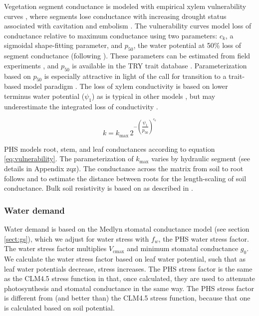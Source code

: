 \documentclass[draft,linenumbers]{agujournal}
\begin{document}
     
     Vegetation segment conductance is modeled with empirical xylem vulnerability curves \citep{tyree1989}, 
     where segments lose conductance with increasing drought status associated with 
     cavitation and embolism \citep{holbrook2001}.
     The vulnerability curves model loss of conductance relative to maximum conductance using two parameters: 
     $c_k$, a sigmoidal shape-fitting parameter, and 
     $p_{50}$, the water potential at 50\% loss of segment conductance (following \cite{gentine2016}). 
     These parameters can be estimated from field experiments \citep{sack2002}, 
     and $p_{50}$ is available in the TRY trait database \citep{kattge2011}.
     Parameterization based on $p_{50}$ is especially attractive in light of the call for transition to
     a trait-based model paradigm \citep{anderegg2015}.
     The loss of xylem conductivity is based on lower terminus water potential ($\psi_1$)
     as is typical in other models \citep{xu2016}, but 
     may underestimate the integrated loss of conductivity \citep{sperry2015}. 
         
     \begin{linenomath*}
     \begin{equation}
     \label{eq:vulnerability}
     k = k_{\text{max}} \, 2^{-\left(\dfrac{\psi_1}{p_{50}}\right)^{c_k}}
     \end{equation}
     \end{linenomath*}
     
     PHS models root, stem, and leaf conductances according to equation \ref{eq:vulnerability}.
     The parameterization of $k_{\text{max}}$ varies by hydraulic segment (see details in Appendix zqz).
     The conductance across the matrix from soil to root follows \citet{williams2001} and \citet{bonan2014} 
     to estimate the distance between roots for the length-scaling of soil conductance. 
     Bulk soil resistivity is based on \citet{clapp1978} as described in \citet{oleson2013}.
    
    \subsubsection{Water demand}
    
    Water demand is based on the Medlyn stomatal conductance model (see section \ref{sect:gs}), 
    which we adjust for water stress with $f_w$, the PHS water stress factor. 
    The water stress factor multiplies $V_{\text{cmax}}$ and minimum stomatal conductance $g_0$.
    We calculate the water stress factor based on leaf water potential, such that 
    as leaf water potentials decrease, stress increases.
    The PHS stress factor is the same as the CLM4.5 stress function in that, once calculated, they are used
    to attenuate photosynthesis and stomatal conductance in the same way.
    The PHS stress factor is different from (and better than) the CLM4.5 stress function, because that one 
    is calculated based on soil potential.
    
\end{document}
